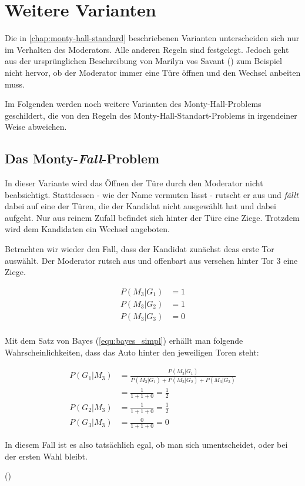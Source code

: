 \chapter{Weitere Varianten}

Die in \autoref{chap:monty-hall-standard} beschriebenen Varianten unterscheiden sich nur im Verhalten des Moderators. Alle anderen Regeln sind festgelegt.
Jedoch geht aus der ursprünglichen Beschreibung von Marilyn vos Savant (\cite{Savant:1990}) zum Beispiel nicht hervor, ob der Moderator immer eine Türe öffnen und den Wechsel anbeiten muss.

Im Folgenden werden noch weitere Varianten des Monty-Hall-Problems geschildert, die von den Regeln des Monty-Hall-Standart-Problems in irgendeiner Weise abweichen.

\section{Das Monty-\textit{Fall}-Problem}

In dieser Variante wird das Öffnen der Türe durch den Moderator nicht beabsichtigt. Stattdessen - wie der Name vermuten lässt - rutscht er aus und \textit{fällt} dabei auf eine der Türen, die der Kandidat nicht ausgewählt hat und dabei aufgeht. Nur aus reinem Zufall befindet sich hinter der Türe eine Ziege. Trotzdem wird dem Kandidaten ein Wechsel angeboten.

Betrachten wir wieder den Fall, dass der Kandidat zunächst deas erste Tor auswählt. Der Moderator rutsch aus und offenbart aus versehen hinter Tor 3 eine Ziege.

\begin{equation*}
    \begin{split}
        P(M_3|G_1) &= 1 \\
        P(M_3|G_2) &= 1 \\
        P(M_3|G_3) &= 0 \\
    \end{split}
\end{equation*}

Mit dem Satz von Bayes (\autoref{equ:bayes_simpl}) erhällt man folgende Wahrscheinlichkeiten, dass das Auto hinter den jeweiligen Toren steht:

\begin{equation}
    \begin{split}
        P(G_1|M_3) & = \frac{P(M_3|G_1)}{P(M_3|G_1) + P(M_3|G_2) + P(M_3|G_3)} \\
        & = \frac{1}{1+1+0} = \frac{1}{2} \\
        P(G_2|M_3) & = \frac{1}{1+1+0} = \frac{1}{2} \\
        P(G_3|M_3) & = \frac{0}{1+1+0} = 0
    \end{split}
\end{equation}

In diesem Fall ist es also tatsächlich egal, ob man sich umentscheidet, oder bei der ersten Wahl bleibt.

(\cite{Rosenthal:2008})

